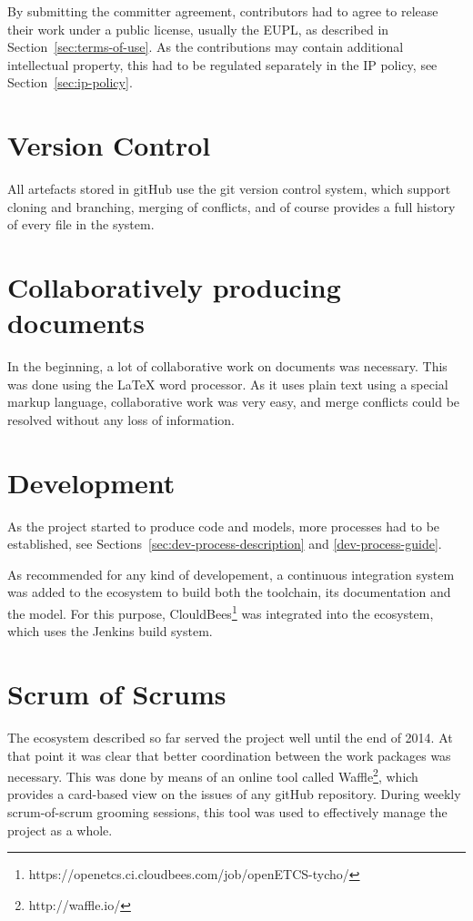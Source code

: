 \documentclass{template/openetcs_report}
\begin{document}
By submitting the committer agreement, contributors had to agree to release their work under a public license, usually the EUPL, as described in Section~\ref{sec:terms-of-use}. As the contributions may contain additional intellectual property, this had to be regulated separately in the IP policy, see Section~\ref{sec:ip-policy}.

\section{Version Control}

All artefacts stored in gitHub use the git version control system, which support cloning and branching, merging of conflicts, and of course provides a full history of every file in the system.

\section{Collaboratively producing documents}

In the beginning, a lot of collaborative work on documents was necessary. This was done using the \LaTeX{} word processor.  As it uses plain text using a special markup language, collaborative work was very easy, and merge conflicts could be resolved without any loss of information.

\section{Development}

As the project started to produce code and models, more processes had to be established, see Sections~\ref{sec:dev-process-description} and \ref{dev-process-guide}.

As recommended for any kind of developement, a continuous integration system was added to the ecosystem to build both the toolchain, its documentation and the model. For this purpose, ClouldBees\footnote{https://openetcs.ci.cloudbees.com/job/openETCS-tycho/} was integrated into the ecosystem, which uses the Jenkins build system.

\section{Scrum of Scrums}

The ecosystem described so far served the project well until the end of 2014. At that point it was clear that better coordination between the work packages was necessary. This was done by means of an online tool called Waffle\footnote{http://waffle.io/}, which provides a card-based view on the issues of any gitHub repository. During weekly scrum-of-scrum grooming sessions, this tool was used to effectively manage the project as a whole.
\end{document}
